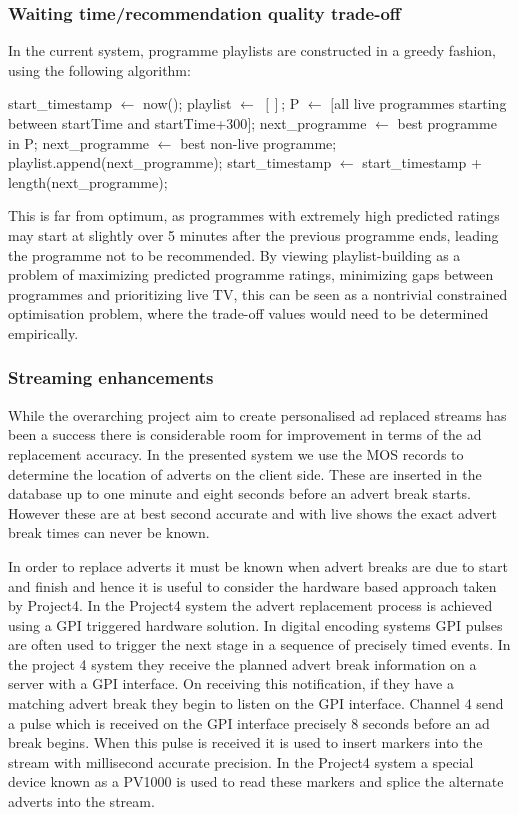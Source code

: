 	\subsubsection{Waiting time/recommendation quality trade-off}
	In the current system, programme playlists are constructed in a greedy fashion, using the following algorithm:
	\begin{algorithmic}[H]
	\State start\_timestamp $\gets$ now();
	\State playlist $\gets$ $[]$;
		\State P $\gets$ $[$all live programmes starting between startTime and startTime+300$]$;
			\State next\_programme $\gets$ best programme in P;
		\Else
			\State next\_programme $\gets$ best non-live programme;
		\EndIf
		\State playlist.append(next\_programme);
		\State start\_timestamp $\gets$ start\_timestamp + length(next\_programme);
	\EndWhile
	\end{algorithmic}
	This is far from optimum, as programmes with extremely high predicted ratings may start at slightly over 5 minutes after the previous programme ends, leading the programme not to be recommended. By viewing playlist-building as a problem of maximizing predicted programme ratings, minimizing gaps between programmes and prioritizing live TV, this can be seen as a nontrivial constrained optimisation problem, where the trade-off values would need to be determined empirically.

	\subsubsection{Streaming enhancements}
	While the overarching project aim to create personalised ad replaced streams has been a success there is considerable room for improvement in terms of the ad replacement accuracy. In the presented system we use the MOS records to determine the location of adverts on the client side. These are inserted in the database up to one minute and eight seconds before an advert break starts. However these are at best second accurate and with live shows the exact advert break times can never be known.

	In order to replace adverts it must be known when advert breaks are due to start and finish and hence it is useful to consider the hardware based approach taken by Project4. In the Project4 system the advert replacement process is achieved using a GPI\citep{SCTE104} triggered hardware solution. In digital encoding systems GPI pulses are often used to trigger the next stage in a sequence of precisely timed events. In the project 4 system they receive the planned advert break information on a server with a GPI interface. On receiving this notification, if they have a matching advert break they begin to listen on the GPI interface. Channel 4 send a pulse which is received on the GPI interface precisely 8 seconds before an ad break begins. When this pulse is received it is used to insert markers into the stream with millisecond accurate precision. In the Project4 system a special device known as a PV1000 is used to read these markers and splice the alternate adverts into the stream.
	
